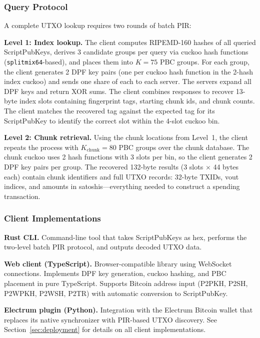 \subsubsection{Query Protocol}

A complete UTXO lookup requires two rounds of batch PIR:

\textbf{Level 1: Index lookup.} The client computes RIPEMD-160 hashes of all queried ScriptPubKeys, derives 3 candidate groups per query via cuckoo hash functions (\texttt{splitmix64}-based), and places them into $K{=}75$ PBC groups. For each group, the client generates 2 DPF key pairs (one per cuckoo hash function in the 2-hash index cuckoo) and sends one share of each to each server. The servers expand all DPF keys and return XOR sums. The client combines responses to recover 13-byte index slots containing fingerprint tags, starting chunk ids, and chunk counts. The client matches the recovered tag against the expected tag for its ScriptPubKey to identify the correct slot within the 4-slot cuckoo bin.

\textbf{Level 2: Chunk retrieval.} Using the chunk locations from Level~1, the client repeats the process with $K_\text{chunk}{=}80$ PBC groups over the chunk database. The chunk cuckoo uses 2 hash functions with 3 slots per bin, so the client generates 2 DPF key pairs per group. The recovered 132-byte results (3 slots $\times$ 44 bytes each) contain chunk identifiers and full UTXO records: 32-byte TXIDs, vout indices, and amounts in satoshis---everything needed to construct a spending transaction.

\subsubsection{Client Implementations}

\textbf{Rust CLI.} Command-line tool that takes ScriptPubKeys as hex, performs the two-level batch PIR protocol, and outputs decoded UTXO data.

\textbf{Web client (TypeScript).} Browser-compatible library using WebSocket connections. Implements DPF key generation, cuckoo hashing, and PBC placement in pure TypeScript. Supports Bitcoin address input (P2PKH, P2SH, P2WPKH, P2WSH, P2TR) with automatic conversion to ScriptPubKey.

\textbf{Electrum plugin (Python).} Integration with the Electrum Bitcoin wallet \cite{electrum} that replaces its native synchronizer with PIR-based UTXO discovery. See Section~\ref{sec:deployment} for details on all client implementations.

